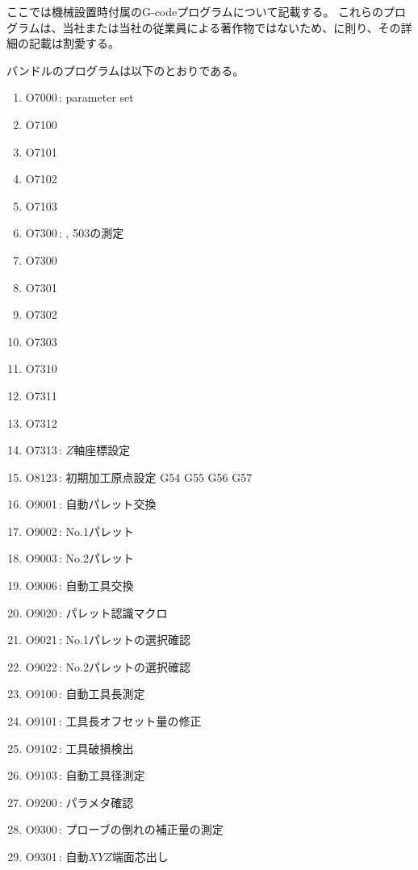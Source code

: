 \setcounter{lstlisting}{0}

ここでは機械設置時付属のG-codeプログラムについて記載する。
これらのプログラムは、当社または当社の従業員による著作物ではないため、に則り、その詳細の記載は割愛する。


バンドルのプログラムは以下のとおりである。
\begin{enumerate}
\item O7000\,: parameter set
\item O7100
\item O7101
\item O7102
\item O7103
\item O7300\,: , \ttNum503の測定
\item O7300
\item O7301
\item O7302
\item O7303
\item O7310
\item O7311
\item O7312
\item O7313\,: \texorpdfstring{$Z$}{Z}軸座標設定
\item O8123\,: 初期加工原点設定 G54 G55 G56 G57
\item O9001\,: 自動パレット交換
\item O9002\,: No.1パレット
\item O9003\,: No.2パレット
\item O9006\,: 自動工具交換
\item O9020\,: パレット認識マクロ
\item O9021\,: No.1パレットの選択確認
\item O9022\,: No.2パレットの選択確認
\item O9100\,: 自動工具長測定
\item O9101\,: 工具長オフセット量の修正
\item O9102\,: 工具破損検出
\item O9103\,: 自動工具径測定
\item O9200\,: パラメタ確認
\item O9300\,: プローブの倒れの補正量の測定
\item O9301\,: 自動\texorpdfstring{$XYZ$}{XYZ}端面芯出し

\end{enumerate}
